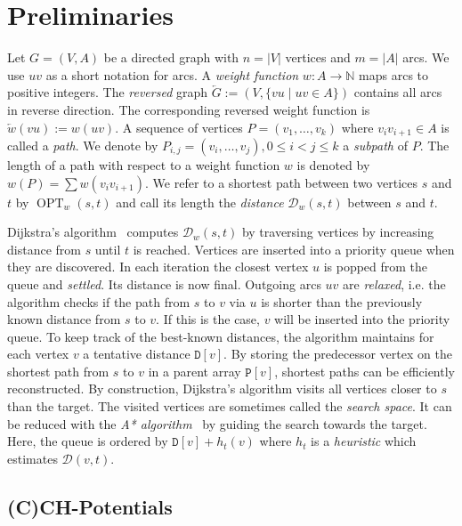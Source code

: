 \documentclass[a4paper,UKenglish,cleveref, autoref, thm-restate]{lipics-v2021}
\newcommand*{\dist}{\mathcal{D}}
\newcommand*{\shp}{\operatorname{OPT}}
\begin{document}
\section{Preliminaries}
\label{sec:prelim}

Let $G=(V,A)$ be a directed graph with $n = |V|$ vertices and $m = |A|$ arcs.
We use $uv$ as a short notation for arcs.
A \emph{weight function} $w : A \to \mathbb{N}$ maps arcs to positive integers.
The \emph{reversed} graph $\overleftarrow{G} := (V, \{ vu \mid uv \in A \})$ contains all arcs in reverse direction.
The corresponding reversed weight function is $\overleftarrow{w}(vu) := w(uv)$.
A sequence of vertices $P = (v_1, \dots, v_k)$ where $v_i v_{i+1} \in A$ is called a \emph{path}.
We denote by $P_{i,j} = (v_i, \dots, v_j), 0 \leq i < j \leq k$ a \emph{subpath} of $P$.
The length of a path with respect to a weight function $w$ is denoted by $w(P) = \sum w(v_i v_{i+1})$.
We refer to a shortest path between two vertices $s$ and $t$ by $\shp_w(s,t)$ and call its length the \emph{distance} $\dist_w(s,t)$ between $s$ and $t$.

Dijkstra's algorithm~\cite{d-ntpcg-59} computes $\dist_w(s,t)$ by traversing vertices by increasing distance from $s$ until $t$ is reached.
Vertices are inserted into a priority queue when they are discovered.
In each iteration the closest vertex $u$ is popped from the queue and \emph{settled}.
Its distance is now final.
Outgoing arcs $uv$ are \emph{relaxed}, i.e. the algorithm checks if the path from $s$ to $v$ via $u$ is shorter than the previously known distance from $s$ to $v$.
If this is the case, $v$ will be inserted into the priority queue.
To keep track of the best-known distances, the algorithm maintains for each vertex $v$ a tentative distance $\mathtt{D}[v]$.
By storing the predecessor vertex on the shortest path from $s$ to $v$ in a parent array $\mathtt{P}[v]$, shortest paths can be efficiently reconstructed.
By construction, Dijkstra's algorithm visits all vertices closer to $s$ than the target.
The visited vertices are sometimes called the \emph{search space}.
It can be reduced with the \emph{A* algorithm}~\cite{hnr-afbhd-68} by guiding the search towards the target.
Here, the queue is ordered by $\mathtt{D}[v] + h_t(v)$ where $h_t$ is a \emph{heuristic} which estimates $\dist(v,t)$.

\subsection{(C)CH-Potentials}
\end{document}
